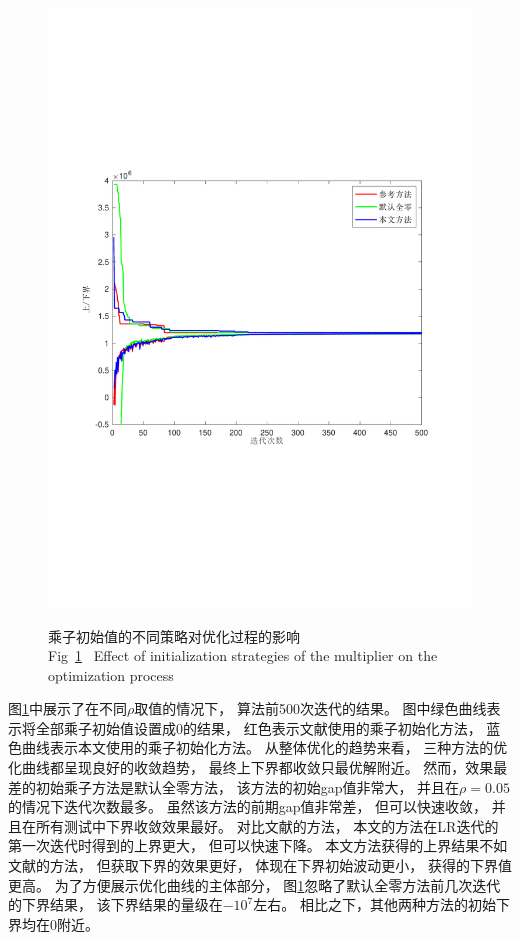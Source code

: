 \begin{figure}[!t]
{		\includegraphics[width=0.47\linewidth]{figures/result_mp_rho0.2.pdf}}
	\quad
	\caption{乘子初始值的不同策略对优化过程的影响\\Fig~\ref{fig:mp_curves}~ Effect of initialization strategies of the multiplier on the optimization process}
	\label{fig:mp_curves}
	\vspace{-0.35cm} %
\end{figure}

图\ref{fig:mp_curves}中展示了在不同$\rho$取值的情况下，
算法前500次迭代的结果。
图中绿色曲线表示将全部乘子初始值设置成0的结果，
红色表示文献\cite{yun2015}使用的乘子初始化方法，
蓝色曲线表示本文使用的乘子初始化方法。
从整体优化的趋势来看，
三种方法的优化曲线都呈现良好的收敛趋势，
最终上下界都收敛只最优解附近。
然而，效果最差的初始乘子方法是默认全零方法，
该方法的初始gap值非常大，
并且在$\rho=0.05$的情况下迭代次数最多。
虽然该方法的前期gap值非常差，
但可以快速收敛，
并且在所有测试中下界收敛效果最好。
对比文献\cite{yun2015}的方法，
本文的方法在LR迭代的第一次迭代时得到的上界更大，
但可以快速下降。
本文方法获得的上界结果不如文献\cite{yun2015}的方法，
但获取下界的效果更好，
体现在下界初始波动更小，
获得的下界值更高。
为了方便展示优化曲线的主体部分，
图\ref{fig:mp_curves}忽略了默认全零方法前几次迭代的下界结果，
该下界结果的量级在$-10^{7}$左右。
相比之下，其他两种方法的初始下界均在0附近。

